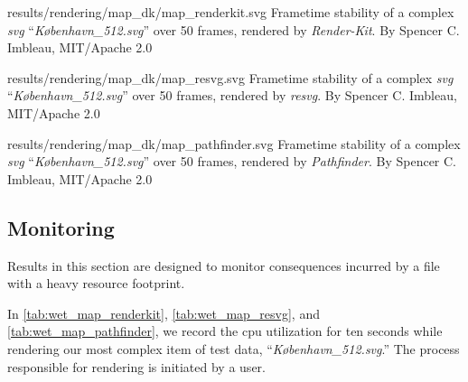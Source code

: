 \widesvg
{results/rendering/map_dk/map_renderkit.svg}
{Frametime stability of a complex \textit{svg} ``\textit{København\_512.svg}'' over 50 frames, rendered by \textit{Render-Kit}.\label{fig:wet_map_renderkit}}
{By Spencer C. Imbleau, MIT/Apache 2.0}\medskip

\widesvg
{results/rendering/map_dk/map_resvg.svg}
{Frametime stability of a complex \textit{svg} ``\textit{København\_512.svg}'' over 50 frames, rendered by \textit{resvg}.\label{fig:wet_map_resvg}}
{By Spencer C. Imbleau, MIT/Apache 2.0}\medskip

\widesvg
{results/rendering/map_dk/map_pathfinder.svg}
{Frametime stability of a complex \textit{svg} ``\textit{København\_512.svg}'' over 50 frames, rendered by \textit{Pathfinder}.\label{fig:wet_map_pathfinder}}
{By Spencer C. Imbleau, MIT/Apache 2.0}\medskip


\subsection{Monitoring}\label{sec:results_monitoring}
Results in this section are designed to monitor consequences incurred by a file with a heavy resource footprint.\medskip

In \cref{tab:wet_map_renderkit}, \cref{tab:wet_map_resvg}, and \cref{tab:wet_map_pathfinder}, we record the cpu utilization for ten seconds while rendering our most complex item of test data, ``\textit{København\_512.svg}.'' The process responsible for rendering is initiated by a user.\medskip

